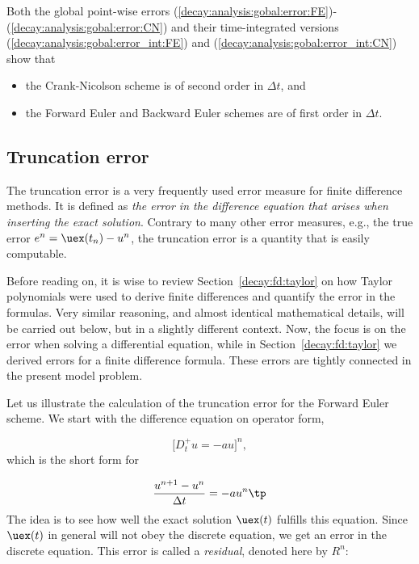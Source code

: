\documentclass[graybox,sectrefs,envcountresetchap,open=right,final]{svmonodo}
\newenvironment{summary_mdfboxadmon}[1][]{
\begin{summary_mdfboxmdframed}[frametitle=#1]
}
{
\end{summary_mdfboxmdframed}
}
\begin{document}
\begin{summary_mdfboxadmon}
Both the global point-wise errors (\ref{decay:analysis:gobal:error:FE})-(\ref{decay:analysis:gobal:error:CN})
and their time-integrated versions (\ref{decay:analysis:gobal:error_int:FE}) and (\ref{decay:analysis:gobal:error_int:CN}) show that

\begin{itemize}
 \item the Crank-Nicolson scheme is of second order in $\Delta t$, and

 \item the Forward Euler and Backward Euler schemes are of first order in $\Delta t$.
\end{itemize}

\noindent
\end{summary_mdfboxadmon} %



\subsection{Truncation error}
\label{decay:analysis:trunc}

The truncation error is a very frequently used error measure for
finite difference methods. It is defined as \emph{the error
in the difference equation that arises when inserting the exact
solution}. Contrary to many other error measures, e.g., the
true error $e^n=\uex(t_n)-u^n$, the truncation error is a quantity that
is easily computable.

Before reading on, it is wise to review Section~\ref{decay:fd:taylor}
on how Taylor polynomials were used to derive finite differences and
quantify the error in the formulas. Very similar reasoning, and almost
identical mathematical details, will be carried out below, but in a slightly
different context. Now, the
focus is on the error when solving a differential
equation, while in Section~\ref{decay:fd:taylor} we derived
errors for a finite difference formula. These errors are tightly
connected in the present model problem.

Let us illustrate the calculation of the truncation error
for the Forward Euler scheme.
We start with the difference equation on operator form,

\[ \lbrack D_t^+ u = -au\rbrack^n,\]
which is the short form for

\[ \frac{u^{n+1}-u^n}{\Delta t} = -au^n\tp\]
The idea is to see how well the exact solution $\uex(t)$ fulfills
this equation. Since $\uex(t)$ in general will not obey the
discrete equation, we get an error in the discrete equation. This
error is called
a \emph{residual}, denoted here by $R^n$:
\end{document}
